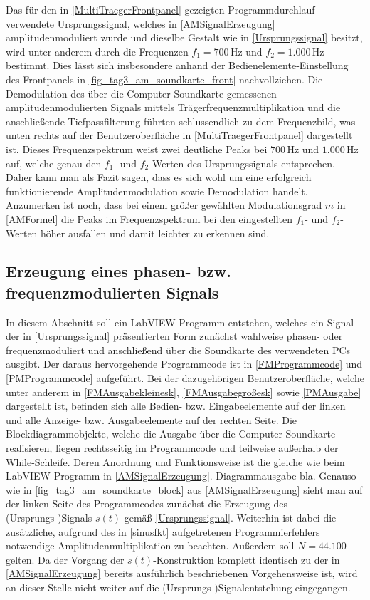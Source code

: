 \documentclass[
a4paper,
12pt,
pagesize,
ngerman
]{scrartcl}
\begin{document}
	Das für den in \cref{MultiTraegerFrontpanel} gezeigten Programmdurchlauf verwendete Ursprungssignal, welches in \cref{AMSignalErzeugung} amplitudenmoduliert wurde und dieselbe Gestalt wie in \cref{Ursprungssignal} besitzt, wird unter anderem durch die Frequenzen $f_1 = 700\,$Hz und $f_2 = 1.000\,$Hz bestimmt. Dies lässt sich insbesondere anhand der Bedienelemente-Einstellung des Frontpanels in \cref{fig_tag3_am_soundkarte_front} nachvollziehen. Die Demodulation des über die Computer-Soundkarte gemessenen amplitudenmodulierten Signals mittels Trägerfrequenzmultiplikation und die anschließende Tiefpassfilterung führten schlussendlich zu dem Frequenzbild, was unten rechts auf der Benutzeroberfläche in \cref{MultiTraegerFrontpanel} dargestellt ist. Dieses Frequenzspektrum weist zwei deutliche Peaks bei $700\,$Hz und $1.000\,$Hz auf, welche genau den $f_1$- und $f_2$-Werten des Ursprungssignals entsprechen. Daher kann man als Fazit sagen, dass es sich wohl um eine erfolgreich funktionierende Amplitudenmodulation sowie Demodulation handelt. Anzumerken ist noch, dass bei einem größer gewählten Modulationsgrad $m$ in \cref{AMFormel} die Peaks im Frequenzspektrum bei den eingestellten $f_1$- und $f_2$-Werten höher ausfallen und damit leichter zu erkennen sind.  
	
	
	
	\subsection{Erzeugung eines phasen- bzw. frequenzmodulierten Signals}
	
	In diesem Abschnitt soll ein LabVIEW-Programm entstehen, welches ein Signal der in \cref{Ursprungssignal} präsentierten Form zunächst wahlweise phasen- oder frequenzmoduliert und anschließend über die Soundkarte des verwendeten PCs ausgibt. Der daraus hervorgehende Programmcode ist in \cref{FMProgrammcode} und \cref{PMProgrammcode} aufgeführt. Bei der dazugehörigen Benutzeroberfläche, welche unter anderem in \cref{FMAusgabekleinesk}, \cref{FMAusgabegroßesk} sowie \cref{PMAusgabe} dargestellt ist, befinden sich alle Bedien- bzw. Eingabeelemente auf der linken und alle Anzeige- bzw. Ausgabeelemente auf der rechten Seite. Die Blockdiagrammobjekte, welche die Ausgabe über die Computer-Soundkarte realisieren, liegen rechtsseitig im Programmcode und teilweise außerhalb der While-Schleife. Deren Anordnung und Funktionsweise ist die gleiche wie beim LabVIEW-Programm in \cref{AMSignalErzeugung}. Diagrammausgabe-bla. Genauso wie in \cref{fig_tag3_am_soundkarte_block} aus \cref{AMSignalErzeugung} sieht man auf der linken Seite des Programmcodes zunächst die Erzeugung des (Ursprungs-)Signals $s(t)$ gemäß \cref{Ursprungssignal}. Weiterhin ist dabei die zusätzliche, aufgrund des in \cref{sinusfkt} aufgetretenen Programmierfehlers notwendige Amplitudenmultiplikation zu beachten. Außerdem soll $N = 44.100$ gelten. Da der Vorgang der $s(t)$-Konstruktion komplett identisch zu der in \cref{AMSignalErzeugung} bereits ausführlich beschriebenen Vorgehensweise ist, wird an dieser Stelle nicht weiter auf die (Ursprungs-)Signalentstehung eingegangen. 
	
\end{document}
